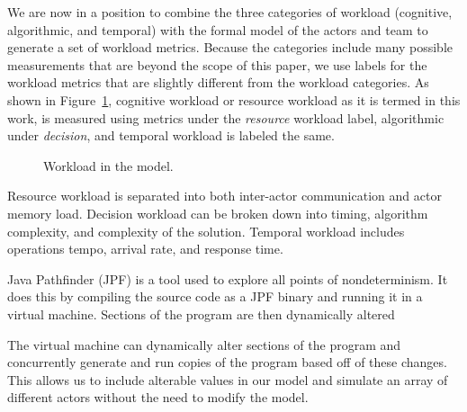 We are now in a position to combine the three categories of workload (cognitive, algorithmic, and temporal) with the formal model of the actors and team to generate a set of workload metrics.  Because the categories include many possible measurements that are beyond the scope of this paper, we use labels for the workload metrics that are slightly different from the workload categories.  As shown in Figure~\ref{fig:WorkloadMetrics}, cognitive workload or resource workload as it is termed in this work, is measured using metrics under the {\em resource} workload label, algorithmic under {\em decision}, and temporal workload is labeled the same. 


\begin{figure}[h]
\center
\setlength{\abovecaptionskip}{1mm}
\setlength{\belowcaptionskip}{1mm}
\setlength{\textfloatsep}{1mm}
\setlength{\floatsep}{1mm}
\caption{Workload in the model.}
\label{fig:WorkloadMetrics}
\end{figure}

Resource workload is separated into both inter-actor communication and actor
memory load. Decision workload can be broken down into timing, algorithm complexity, and complexity of the solution. Temporal workload includes operations tempo, arrival rate, and response time.

Java Pathfinder (JPF) is a tool used to explore all points of nondeterminism.
It does this by compiling the source code as a JPF binary and
running it in a virtual machine.
Sections of the program are then dynamically altered 

The virtual machine can dynamically alter sections of the program and concurrently generate and run copies of the program
based off of these changes. This allows us to include alterable values in our
model and simulate an array of different actors without the need to modify the
model.


